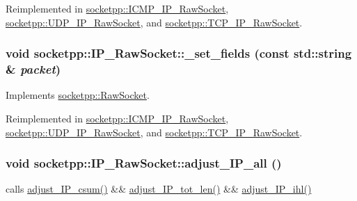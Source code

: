Reimplemented in \hyperlink{classsocketpp_1_1ICMP__IP__RawSocket_49a62078d6febf7a11b9350de1e23903}{socketpp::ICMP\_\-IP\_\-RawSocket}, \hyperlink{classsocketpp_1_1UDP__IP__RawSocket_16035f1b701b898f0e4de44a9ac8bbb3}{socketpp::UDP\_\-IP\_\-RawSocket}, and \hyperlink{classsocketpp_1_1TCP__IP__RawSocket_281508237add8a3c530bb0be0b6a1e7b}{socketpp::TCP\_\-IP\_\-RawSocket}.\hypertarget{classsocketpp_1_1IP__RawSocket_c39832f1ad83184cd5ba94c4c967f465}{
\subsubsection[{\_\-set\_\-fields}]{\setlength{\rightskip}{0pt plus 5cm}void socketpp::IP\_\-RawSocket::\_\-set\_\-fields (const std::string \& {\em packet})}}
\label{classsocketpp_1_1IP__RawSocket_c39832f1ad83184cd5ba94c4c967f465}




Implements \hyperlink{classsocketpp_1_1RawSocket_45e6b041703cb8ae0f93dd19766865d5}{socketpp::RawSocket}.

Reimplemented in \hyperlink{classsocketpp_1_1ICMP__IP__RawSocket_6d2f188d46030afa13f9c3971d43d518}{socketpp::ICMP\_\-IP\_\-RawSocket}, \hyperlink{classsocketpp_1_1UDP__IP__RawSocket_40fde867fa138b495f660864023a3eb1}{socketpp::UDP\_\-IP\_\-RawSocket}, and \hyperlink{classsocketpp_1_1TCP__IP__RawSocket_f8f606ce33835813cc5c3a530e181432}{socketpp::TCP\_\-IP\_\-RawSocket}.\hypertarget{classsocketpp_1_1IP__RawSocket_45e60510233daaa2f279d3a4706fdce5}{
\subsubsection[{adjust\_\-IP\_\-all}]{\setlength{\rightskip}{0pt plus 5cm}void socketpp::IP\_\-RawSocket::adjust\_\-IP\_\-all ()}}
\label{classsocketpp_1_1IP__RawSocket_45e60510233daaa2f279d3a4706fdce5}


calls \hyperlink{classsocketpp_1_1IP__RawSocket_187bab79c6a8bae17b400a132063a9d1}{adjust\_\-IP\_\-csum()} \&\& \hyperlink{classsocketpp_1_1IP__RawSocket_32d2c08139fb43abb92679bdabecf778}{adjust\_\-IP\_\-tot\_\-len()} \&\& \hyperlink{classsocketpp_1_1IP__RawSocket_d84d5e193a15baf421c64011a9c27359}{adjust\_\-IP\_\-ihl()} 

